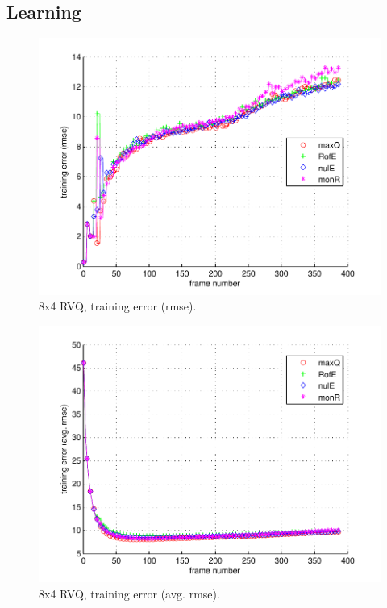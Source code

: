 \subsection{Learning}

								\begin{figure}[h!]
								\centering
								\includegraphics[height=0.4\textheight]{thesis/7_car11_8_4_1000_trg_rmse.pdf}
								\caption{8x4 RVQ, training error (rmse).}
								\label{fig:7_car11_8_4_1000_trg_rmse}
								\end{figure}


								\begin{figure}[h!]
								\centering
								\includegraphics[height=0.4\textheight]{thesis/7_car11_8_4_1000_trg_armse.pdf}
								\caption{8x4 RVQ, training error (avg. rmse).}
								\label{fig:7_car11_8_4_1000_trg_armse}
								\end{figure}

